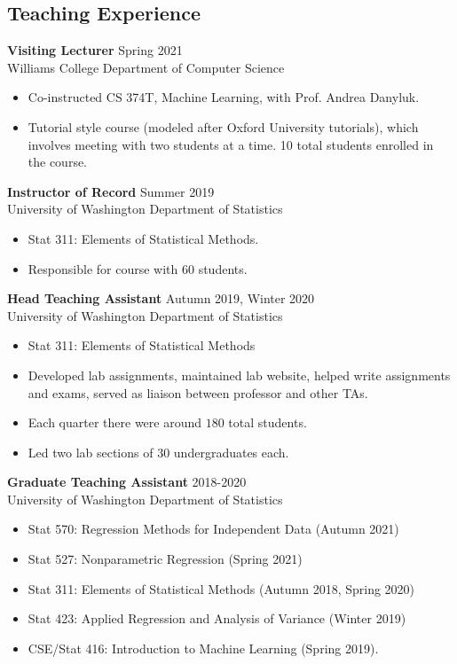 \documentclass[margin, 10pt]{res} %
\begin{document}
\begin{resume}
\section{Teaching Experience}
{\textbf{Visiting Lecturer}} \hfill Spring 2021 \\
Williams College Department of Computer Science
\begin{itemize}
\item Co-instructed CS 374T, Machine Learning, with Prof. Andrea Danyluk.
\item Tutorial style course (modeled after Oxford University tutorials), which involves meeting with two students at a time. 10 total students enrolled in the course. 
\end{itemize}
{\textbf{Instructor of Record}} \hfill Summer 2019 \\
University of Washington Department of Statistics
\begin{itemize}
\item Stat 311: Elements of Statistical Methods.
\item Responsible for course with $60$ students.
\end{itemize}
{\textbf{Head Teaching Assistant}} \hfill Autumn 2019, Winter 2020 \\
University of Washington Department of Statistics
\begin{itemize}
\item Stat 311: Elements of Statistical Methods
\item Developed lab assignments, maintained lab website, helped write assignments and exams, served as liaison between professor and other TAs.  
\item Each quarter there were around $180$ total students. 
\item Led two lab sections of 30 undergraduates each. 
\end{itemize} 
{\textbf{Graduate Teaching Assistant}} \hfill 2018-2020\\
University of Washington Department of Statistics
\begin{itemize}
\item Stat 570: Regression Methods for Independent Data (Autumn 2021)
\item Stat 527: Nonparametric Regression (Spring 2021)
\item Stat 311: Elements of Statistical Methods (Autumn 2018, Spring 2020)
\item Stat 423:  Applied Regression and Analysis of Variance (Winter 2019)
\item CSE/Stat 416: Introduction to Machine Learning (Spring 2019). 

\end{itemize}
\end{resume}
\end{document}
